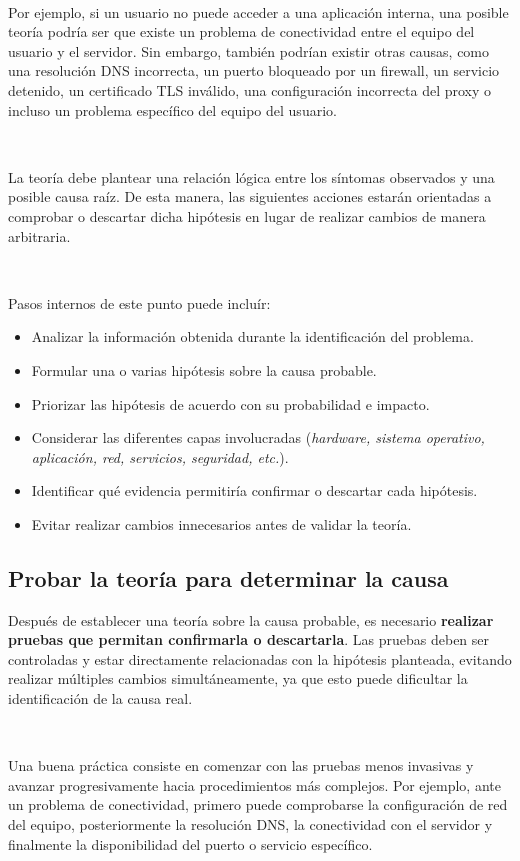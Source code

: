 \documentclass[a4paper,10pt]{article}
\begin{document}
\

Por ejemplo, si un usuario no puede acceder a una aplicación interna, una posible teoría podría ser que existe un problema de conectividad entre el equipo del usuario y el servidor. 
Sin embargo, también podrían existir otras causas, como una resolución DNS incorrecta, un puerto bloqueado por un firewall, un servicio detenido, un certificado TLS inválido, una configuración incorrecta del proxy o incluso un problema específico del equipo del usuario.

\

La teoría debe plantear una relación lógica entre los síntomas observados y una posible causa raíz. 
De esta manera, las siguientes acciones estarán orientadas a comprobar o descartar dicha hipótesis en lugar de realizar cambios de manera arbitraria.

\

Pasos internos de este punto puede incluír:

\begin{itemize}
    \item Analizar la información obtenida durante la identificación del problema.
    \item Formular una o varias hipótesis sobre la causa probable.
    \item Priorizar las hipótesis de acuerdo con su probabilidad e impacto.
    \item Considerar las diferentes capas involucradas (\textit{hardware, sistema operativo, aplicación, red, servicios, seguridad, etc.}).
    \item Identificar qué evidencia permitiría confirmar o descartar cada hipótesis.
    \item Evitar realizar cambios innecesarios antes de validar la teoría.
\end{itemize}

\subsection{Probar la teoría para determinar la causa}
Después de establecer una teoría sobre la causa probable, es necesario \textbf{realizar pruebas que permitan confirmarla o descartarla}. Las pruebas deben ser controladas y estar directamente relacionadas con la hipótesis planteada, evitando realizar múltiples cambios simultáneamente, 
ya que esto puede dificultar la identificación de la causa real.

\

Una buena práctica consiste en comenzar con las pruebas menos invasivas y avanzar progresivamente hacia procedimientos más complejos. 
Por ejemplo, ante un problema de conectividad, primero puede comprobarse la configuración de red del equipo, posteriormente la resolución DNS, la conectividad con el servidor y finalmente la disponibilidad del puerto o servicio específico.
\end{document}
